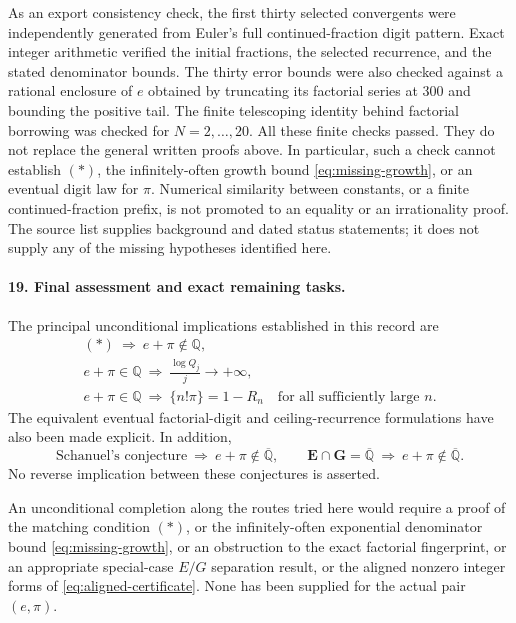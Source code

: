 \documentclass[11pt]{article}
\newcommand{\Q}{\mathbb Q}
\newcommand{\Qbar}{\overline{\mathbb Q}}
\begin{document}
As an export consistency check, the first thirty selected convergents were
independently generated from Euler's full continued-fraction digit pattern.
Exact integer arithmetic verified the initial fractions, the selected
recurrence, and the stated denominator bounds. The thirty error bounds
were also checked against a rational enclosure of $e$ obtained by
truncating its factorial series at $300$ and bounding the positive tail.
The finite telescoping identity behind factorial borrowing was checked
for $N=2,\ldots,20$. All these finite checks passed. They do not replace the
general written proofs above. In particular, such a check cannot establish $(*)$, the
infinitely-often growth bound \eqref{eq:missing-growth}, or an eventual
digit law for $\pi$. Numerical similarity between constants, or a finite
continued-fraction prefix, is not promoted to an equality or an
irrationality proof. The source list supplies background and dated status
statements; it does not supply any of the missing hypotheses identified
here.

\paragraph{19. Final assessment and exact remaining tasks.}
The principal unconditional implications established in this record are
\begin{gather}
 (*)\ \Longrightarrow\ e+\pi\notin\Q,\label{eq:summary-match}\\
 e+\pi\in\Q\ \Longrightarrow\
  \frac{\log Q_j}{j}\longrightarrow+\infty,\label{eq:summary-growth}\\
 e+\pi\in\Q\ \Longrightarrow\
  \{n!\pi\}=1-R_n\quad\text{for all sufficiently large }n.
 \label{eq:summary-factorial}
\end{gather}
The equivalent eventual factorial-digit and ceiling-recurrence
formulations have also been made explicit. In addition,
\[
 \text{Schanuel's conjecture}\ \Longrightarrow\ e+\pi\notin\Qbar,
 \qquad
 \mathbf E\cap\mathbf G=\Qbar\ \Longrightarrow\ e+\pi\notin\Qbar.
\]
No reverse implication between these conjectures is asserted.

An unconditional completion along the routes tried here would require a
proof of the matching condition $(*)$, or the infinitely-often exponential
denominator bound \eqref{eq:missing-growth}, or an obstruction to the exact
factorial fingerprint, or an appropriate special-case $E/G$ separation
result, or the aligned nonzero integer forms of
\eqref{eq:aligned-certificate}. None has been supplied for the actual
pair $(e,\pi)$.
\end{document}
